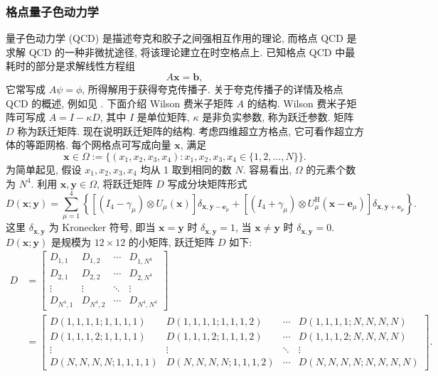 \subsubsection{{格点量子色动力学}}\label{subsec:lattice-qcd}
{量子色动力学 (QCD) 是描述夸克和胶子之间强相互作用的理论, 而格点 QCD 是求解 QCD 的一种非微扰途径, 将该理论建立在时空格点上. 已知格点 QCD 中最耗时的部分是求解线性方程组}
\[A\boldsymbol{x}=\boldsymbol{b},\]
{它常写成 $A\psi=\phi$, 所得解用于获得夸克传播子. 关于夸克传播子的详情及格点 QCD 的概述, 例如见 . 下面介绍 Wilson 费米子矩阵 $A$ 的结构.}
{Wilson 费米子矩阵可写成 $A=I-\kappa D$, 其中 $I$ 是单位矩阵, $\kappa$ 是非负实参数, 称为跃迁参数. 矩阵 $D$ 称为跃迁矩阵. 现在说明跃迁矩阵的结构.}
{考虑四维超立方格点, 它可看作超立方体的等距网格. 每个网格点可写成向量 $\boldsymbol{x}$, 满足}
\[\boldsymbol{x}\in\Omega:=\{(x_1,x_2,x_3,x_4):x_1,x_2,x_3,x_4\in\{1,2,\ldots,N\}\}.\]
{为简单起见, 假设 $x_1,x_2,x_3,x_4$ 均从 1 取到相同的数 $N$. 容易看出, $\Omega$ 的元素个数为 $N^4$. 利用 $\boldsymbol{x},\boldsymbol{y}\in\Omega$, 将跃迁矩阵 $D$ 写成分块矩阵形式}
\begin{equation}\label{eq:wilson-hopping-block}
D(\boldsymbol{x};\boldsymbol{y})=\sum_{\mu=1}^4\left\{[(I_4-\gamma_\mu)\otimes U_\mu(\boldsymbol{x})]\delta_{\boldsymbol{x},\boldsymbol{y}-\boldsymbol{e}_\mu}
+[(I_4+\gamma_\mu)\otimes U_\mu^{\mathrm H}(\boldsymbol{x}-\boldsymbol{e}_\mu)]\delta_{\boldsymbol{x},\boldsymbol{y}+\boldsymbol{e}_\mu}\right\}.
\end{equation}
{这里 $\delta_{\boldsymbol{x},\boldsymbol{y}}$ 为 Kronecker 符号, 即当 $\boldsymbol{x}=\boldsymbol{y}$ 时 $\delta_{\boldsymbol{x},\boldsymbol{y}}=1$, 当 $\boldsymbol{x}\ne\boldsymbol{y}$ 时 $\delta_{\boldsymbol{x},\boldsymbol{y}}=0$. $D(\boldsymbol{x};\boldsymbol{y})$ 是规模为 $12\times12$ 的小矩阵, 跃迁矩阵 $D$ 如下:}
\[\begin{aligned}
D&=\begin{bmatrix}D_{1,1}&D_{1,2}&\cdots&D_{1,N^4}\\D_{2,1}&D_{2,2}&\cdots&D_{2,N^4}\\\vdots&\vdots&\ddots&\vdots\\D_{N^4,1}&D_{N^4,2}&\cdots&D_{N^4,N^4}\end{bmatrix}\\
&=\begin{bmatrix}
D(1,1,1,1;1,1,1,1)&D(1,1,1,1;1,1,1,2)&\cdots&D(1,1,1,1;N,N,N,N)\\
D(1,1,1,2;1,1,1,1)&D(1,1,1,2;1,1,1,2)&\cdots&D(1,1,1,2;N,N,N,N)\\
\vdots&\vdots&\ddots&\vdots\\
D(N,N,N,N;1,1,1,1)&D(N,N,N,N;1,1,1,2)&\cdots&D(N,N,N,N;N,N,N,N)
\end{bmatrix}.
\end{aligned}\]
